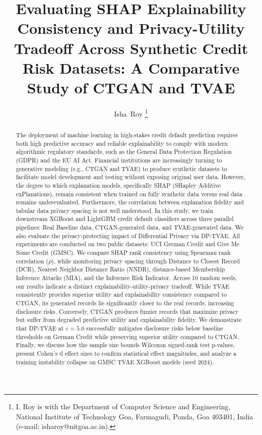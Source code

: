 \documentclass[journal]{IEEEtran}
\begin{document}
\title{Evaluating SHAP Explainability Consistency and Privacy-Utility Tradeoff Across Synthetic Credit Risk Datasets: A Comparative Study of CTGAN and TVAE}

\author{Isha~Roy
\thanks{I. Roy is with the Department of Computer Science and Engineering, National Institute of Technology Goa, Farmagudi, Ponda, Goa 403401, India (e-mail: isharoy@nitgoa.ac.in).}}

\maketitle

\begin{abstract}
The deployment of machine learning in high-stakes credit default prediction requires both high predictive accuracy and reliable explainability to comply with modern algorithmic regulatory standards, such as the General Data Protection Regulation (GDPR) and the EU AI Act. Financial institutions are increasingly turning to generative modeling (e.g., CTGAN and TVAE) to produce synthetic datasets to facilitate model development and testing without exposing original user data. However, the degree to which explanation models, specifically SHAP (SHapley Additive exPlanations), remain consistent when trained on fully synthetic data versus real data remains underevaluated. Furthermore, the correlation between explanation fidelity and tabular data privacy spacing is not well understood. In this study, we train downstream XGBoost and LightGBM credit default classifiers across three parallel pipelines: Real Baseline data, CTGAN-generated data, and TVAE-generated data. We also evaluate the privacy-protecting impact of Differential Privacy via DP-TVAE. All experiments are conducted on two public datasets: UCI German Credit and Give Me Some Credit (GMSC). We compare SHAP rank consistency using Spearman rank correlation ($\rho$), while monitoring privacy spacing through Distance to Closest Record (DCR), Nearest Neighbor Distance Ratio (NNDR), distance-based Membership Inference Attacks (MIA), and the Inference Risk Indicator. Across 10 random seeds, our results indicate a distinct explainability-utility-privacy tradeoff. While TVAE consistently provides superior utility and explainability consistency compared to CTGAN, its generated records lie significantly closer to the real records, increasing disclosure risks. Conversely, CTGAN produces fuzzier records that maximize privacy but suffer from degraded predictive utility and explainability fidelity. We demonstrate that DP-TVAE at $\varepsilon=5.0$ successfully mitigates disclosure risks below baseline thresholds on German Credit while preserving superior utility compared to CTGAN. Finally, we discuss how the sample size bounds Wilcoxon signed-rank test p-values, present Cohen's d effect sizes to confirm statistical effect magnitudes, and analyze a training instability collapse on GMSC TVAE XGBoost models (seed 2024).
\end{abstract}
\end{document}
